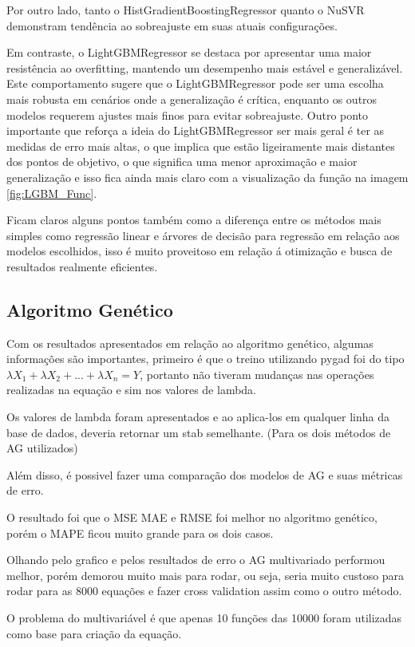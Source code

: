 \documentclass[journal]{IEEEtran}
\begin{document}
Por outro lado, tanto o HistGradientBoostingRegressor quanto o NuSVR demonstram tendência ao sobreajuste em suas atuais configurações.

Em contraste, o LightGBMRegressor se destaca por apresentar uma maior resistência ao overfitting, mantendo um desempenho mais estável e generalizável. Este comportamento sugere que o LightGBMRegressor pode ser uma escolha mais robusta em cenários onde a generalização é crítica, enquanto os outros modelos requerem ajustes mais finos para evitar sobreajuste. Outro ponto importante que reforça a ideia do LightGBMRegressor ser mais geral é ter as medidas de erro mais altas, o que implica que estão ligeiramente mais distantes dos pontos de objetivo, o que significa uma menor aproximação e maior generalização e isso fica ainda mais claro com a visualização da função na imagem \ref{fig:LGBM_Func}.

Ficam claros alguns pontos também como a diferença entre os métodos mais simples como regressão linear e árvores de decisão para regressão em relação aos modelos escolhidos, isso é muito proveitoso em relação á otimização e busca de resultados realmente eficientes.

\subsection{Algoritmo Genético}

Com os resultados apresentados em relação ao algoritmo genético, algumas informações são importantes, primeiro é que o treino utilizando pygad foi do tipo $\lambda X_1 + \lambda X_2 + ... + \lambda X_n = Y$, portanto não tiveram mudanças nas operações realizadas na equação e sim nos valores de lambda.

Os valores de lambda foram apresentados e ao aplica-los em qualquer linha da base de dados, deveria retornar um stab semelhante. (Para os dois métodos de AG utilizados)

Além disso, é possivel fazer uma comparação dos modelos de AG e suas métricas de erro.

O resultado foi que o MSE MAE e RMSE foi melhor no algoritmo genético, porém o MAPE ficou muito grande para os dois casos.

Olhando pelo grafico e pelos resultados de erro o AG multivariado performou melhor, porém demorou muito mais para rodar, ou seja, seria muito custoso para rodar para as 8000 equações e fazer cross validation assim como o outro método.

O problema do multivariável é que apenas 10 funções das 10000 foram utilizadas como base para criação da equação.
\end{document}
